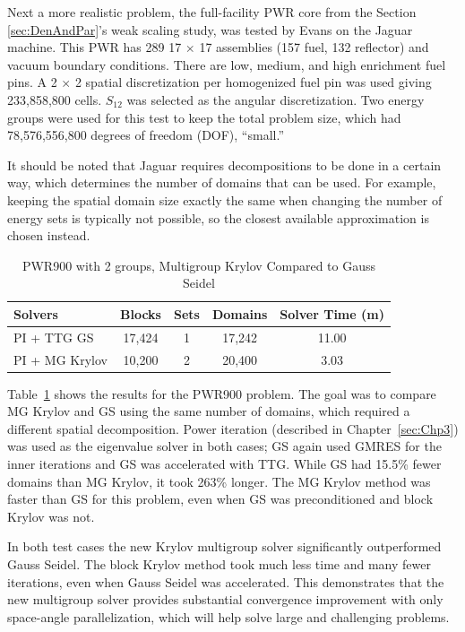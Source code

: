 Next a more realistic problem, the full-facility PWR core from the Section \ref{sec:DenAndPar}'s weak scaling study, was tested by Evans on the Jaguar machine. This PWR has 289 17 $\times$ 17 assemblies (157 fuel, 132 reflector) and vacuum boundary conditions. There are low, medium, and high enrichment fuel pins. A 2 $\times$ 2 spatial discretization per homogenized fuel pin was used giving 233,858,800 cells. $S_{12}$ was selected as the angular discretization. Two energy groups were used for this test to keep the total problem size, which had 78,576,556,800 degrees of freedom (DOF), ``small.'' 

It should be noted that Jaguar requires decompositions to be done in a certain way, which determines the number of domains that can be used. For example, keeping the spatial domain size exactly the same when changing the number of energy sets is typically not possible, so the closest available approximation is chosen instead.

\begin{table}[!h]
\caption{PWR900 with 2 groups, Multigroup Krylov Compared to Gauss Seidel}
\begin{center}
\begin{tabular}{| l | c | c | c | c |}
\hline
Solvers & Blocks & Sets & Domains & Solver Time (m) \\[0.5ex]
\hline
PI + TTG GS & 17,424 & 1 & 17,242 & 11.00 \\
PI + MG Krylov & 10,200 & 2 & 20,400 & 3.03 \\
\hline
\end{tabular}
\end{center}
\label{table:MGkrylovPWR}
\end{table}
%
Table~\ref{table:MGkrylovPWR} shows the results for the PWR900 problem. The goal was to compare MG Krylov and GS using the same number of domains, which required a different spatial decomposition. Power iteration (described in Chapter~\ref{sec:Chp3}) was used as the eigenvalue solver in both cases; GS again used GMRES for the inner iterations and GS was accelerated with TTG. While GS had 15.5\% fewer domains than MG Krylov, it took 263\% longer. The MG Krylov method was faster than GS for this problem, even when GS was preconditioned and block Krylov was not. 

In both test cases the new Krylov multigroup solver significantly outperformed Gauss Seidel. The block Krylov method took much less time and many fewer iterations, even when Gauss Seidel was accelerated. This demonstrates that the new multigroup solver provides substantial convergence improvement with only space-angle parallelization, which will help solve large and challenging problems. 

